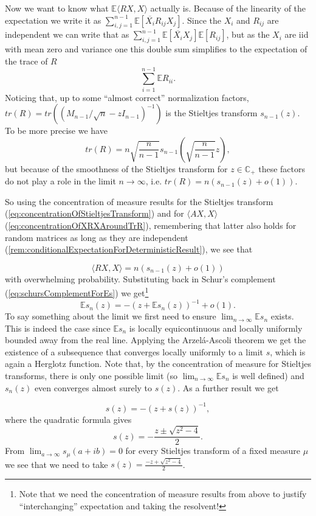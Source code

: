 Now we want to know what $\mathbb E\langle RX,X\rangle$ actually is. Because of the linearity of the expectation we write it as $\sum_{i,j=1}^{n-1}\mathbb E[\overline{X_i}R_{ij}X_j]$. Since the $X_i$ and $R_{ij}$ are independent we can write that as $\sum_{i,j=1}^{n-1}\mathbb E[\overline{X_i}X_j]\mathbb E[R_{ij}]$, but as the $X_i$ are iid with mean zero and variance one this double sum simplifies to the expectation of the trace of $R$ $$\sum_{i=1}^{n-1}\mathbb ER_{ii}.$$
Noticing that, up to some ``almost correct'' normalization factors, $tr(R)=tr\left((M_{n-1}/\sqrt n-zI_{n-1})^{-1}\right)$ is the Stieltjes transform $s_{n-1}(z)$. To be more precise we have $$tr(R)=n\sqrt{\frac{n}{n-1}}s_{n-1}\left(\sqrt{\frac{n}{n-1}}z\right),$$
but because of the smoothness of the Stieltjes transform for $z\in\mathbb C_+$ these factors do not play a role in the limit $n\rightarrow\infty$, i.e. $tr(R)=n(s_{n-1}(z)+o(1))$.

So using the concentration of measure results for the Stieltjes transform (\eqref{eq:concentrationOfStieltjesTransform}) and for $\langle AX,X\rangle$(\eqref{eq:concentrationOfXRXAroundTrR}), remembering that latter also holds for random matrices as long as they are independent (\ref{rem:conditionalExpectationForDeterministicResult}), we see that

$$\langle RX,X\rangle=n(s_{n-1}(z)+o(1))$$
with overwhelming probability. Substituting back in Schur's complement (\eqref{eq:schursComplementForEs}) we get\footnote{Note that we need the concentration of measure results from above to justify ``interchanging'' expectation and taking the resolvent!} $$\mathbb Es_n(z)=-(z+\mathbb Es_n(z))^{-1}+o(1).$$
To say something about the limit we first need to ensure $\lim_{n\rightarrow\infty}\mathbb Es_n$ exists. This is indeed the case since $\mathbb Es_n$ is locally equicontinuous and locally uniformly bounded away from the real line. Applying the Arzel\'{a}-Ascoli theorem we get the existence of a subsequence that converges locally uniformly to a limit $s$, which is again a Herglotz function. Note that, by the concentration of measure for Stieltjes transforms, there is only one possible limit (so $\lim_{n\rightarrow\infty}\mathbb Es_n$ is well defined) and $s_n(z)$ even converges almost surely to $s(z)$. As a further result we get

$$s(z)=-(z+s(z))^{-1},$$
where the quadratic formula gives $$s(z)=-\frac{z\pm\sqrt{z^2-4}}{2}.$$
From $\lim_{a\rightarrow\infty}s_\mu(a+ib)=0$ for every Stieltjes transform of a fixed measure $\mu$ we see that we need to take $s(z)=\frac{-z+\sqrt{z^2-4}}{2}$.

